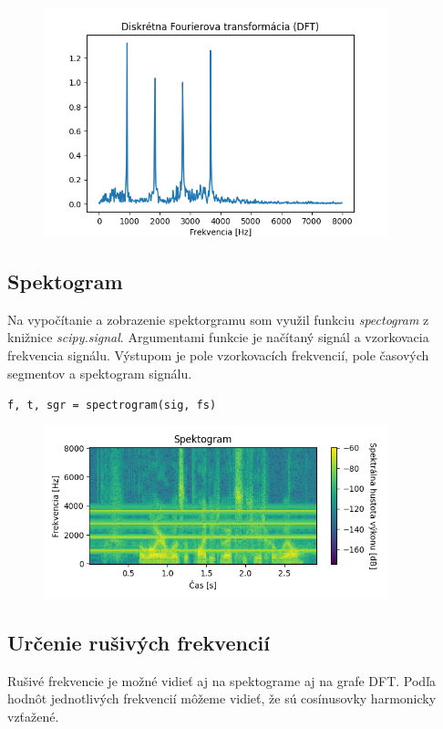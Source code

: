 \documentclass[a4paper,oneside]{article}
\begin{document}
	\begin{figure}[ht]
	    \begin{center}
		    \includegraphics[width=10cm,keepaspectratio]{uloha4-3.png}
		\end{center}
	\end{figure}
	
	\subsection{Spektogram}
	
	Na vypočítanie a zobrazenie spektorgramu som využil funkciu \textit{spectogram} z knižnice \textit{scipy.signal}. Argumentami funkcie je načítaný signál a vzorkovacia frekvencia signálu. Výstupom je pole vzorkovacích frekvencií, pole časových segmentov a spektogram signálu.
	
	\begin{center}
	       \verb|f, t, sgr = spectrogram(sig, fs)|
    \end{center}

	\begin{figure}[ht]
	    \begin{center}
		    \includegraphics[width=10cm,keepaspectratio]{uloha4-4.png}
		\end{center}
	\end{figure}
	
	
	\subsection{Určenie rušivých frekvencií}
	Rušivé frekvencie je možné vidieť aj na spektograme aj na grafe DFT. Podľa hodnôt jednotlivých frekvencií môžeme vidieť, že sú cosínusovky harmonicky vzťažené.
	
\end{document}
